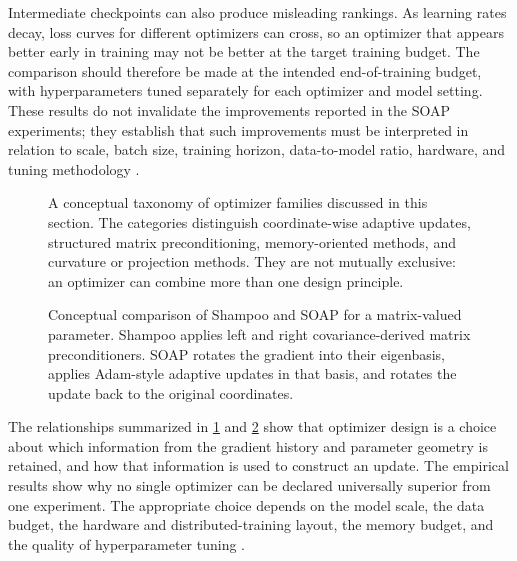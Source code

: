 Intermediate checkpoints can also produce misleading rankings.
As learning rates decay, loss curves for different optimizers can
cross, so an optimizer that appears better early in training may
not be better at the target training budget. The comparison should
therefore be made at the intended end-of-training budget, with
hyperparameters tuned separately for each optimizer and model
setting. These results do not invalidate the improvements reported
in the SOAP experiments; they establish that such improvements
must be interpreted in relation to scale, batch size, training
horizon, data-to-model ratio, hardware, and tuning methodology
\parencite{Vyas2025SOAP,Wen2026Fantastic}.

\begin{figure}[htbp]
    \centering
    
    \caption{A conceptual taxonomy of optimizer families discussed in
    this section. The categories distinguish coordinate-wise adaptive
    updates, structured matrix preconditioning, memory-oriented
    methods, and curvature or projection methods. They are not
    mutually exclusive: an optimizer can combine more than one
    design principle.}
    \label{fig:optimizer-taxonomy}
\end{figure}

\begin{figure}[htbp]
    \centering
    
    \caption{Conceptual comparison of Shampoo and SOAP for a matrix-valued
    parameter. Shampoo applies left and right covariance-derived matrix
    preconditioners. SOAP rotates the gradient into their eigenbasis,
    applies Adam-style adaptive updates in that basis, and rotates the
    update back to the original coordinates.}
    \label{fig:shampoo-soap-geometry}
\end{figure}

The relationships summarized in \cref{fig:optimizer-taxonomy} and
\cref{fig:shampoo-soap-geometry} show that optimizer design is a
choice about which information from the gradient history and
parameter geometry is retained, and how that information is used
to construct an update. The empirical results show why no single
optimizer can be declared universally superior from one experiment.
The appropriate choice depends on the model scale, the data budget,
the hardware and distributed-training layout, the memory budget,
and the quality of hyperparameter tuning
\parencite{Ranganath2026Navigating,Wen2026Fantastic}.

